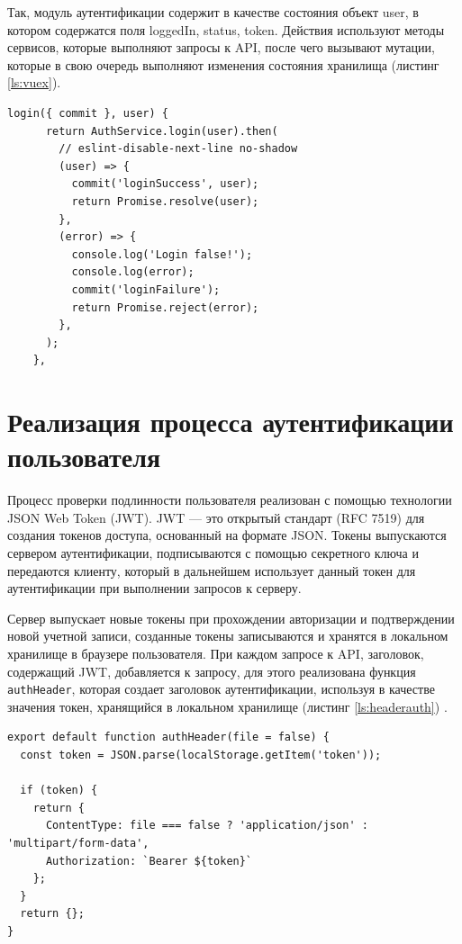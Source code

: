 Так, модуль аутентификации содержит в качестве состояния объект user, в котором содержатся поля loggedIn, status, token. Действия используют методы сервисов, которые выполняют запросы к API, после чего вызывают мутации, которые в свою очередь выполняют изменения состояния хранилища (листинг \ref{ls:vuex}).

\begin{lstlisting}[caption={Реализация действия авторизации}, label={ls:vuex}]
    login({ commit }, user) {
      return AuthService.login(user).then(
        // eslint-disable-next-line no-shadow
        (user) => {
          commit('loginSuccess', user);
          return Promise.resolve(user);
        },
        (error) => {
          console.log('Login false!');
          console.log(error);
          commit('loginFailure');
          return Promise.reject(error);
        },
      );
    },
\end{lstlisting}

\section{Реализация процесса аутентификации пользователя}

Процесс проверки подлинности пользователя реализован с помощью технологии JSON Web Token (JWT). JWT — это открытый стандарт (RFC 7519) для создания токенов доступа, основанный на формате JSON. Токены выпускаются сервером аутентификации, подписываются с помощью секретного ключа и передаются клиенту, который в дальнейшем использует данный токен для аутентификации при выполнении запросов к серверу.

Сервер выпускает новые токены при прохождении авторизации и подтверждении новой учетной записи, созданные токены записываются и хранятся в локальном хранилище в браузере пользователя. При каждом запросе к API, заголовок, содержащий JWT, добавляется к запросу, для этого реализована функция \verb|authHeader|, которая создает заголовок аутентификации, используя в качестве значения токен, хранящийся в локальном хранилище (листинг \ref{ls:headerauth}) \cite{jwt}.

\begin{lstlisting}[caption={Реализация функции создающей заголовок аутентификации}, label={ls:headerauth}]
export default function authHeader(file = false) {
  const token = JSON.parse(localStorage.getItem('token'));

  if (token) {
    return {
      ContentType: file === false ? 'application/json' :  'multipart/form-data',
      Authorization: `Bearer ${token}`
    };
  }
  return {};
}
\end{lstlisting}

